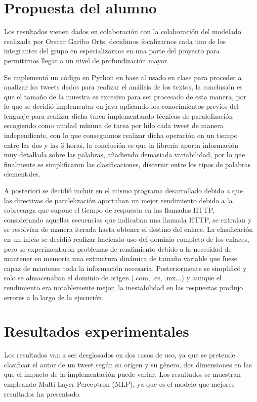 \documentclass[11pt,a4paper]{article}
\begin{document}
\section{Propuesta del alumno}

Los resultados vienen dados en colaboración con la colaboración del modelado realizada por Orscar Garibo Orts, decidimos focalizarnos cada uno de los integrantes del grupo en especializarnos en una parte del proyecto para permitirnos llegar a un nivel de profundización mayor.

Se implementó un código en Python en base al usado en clase para proceder a analizar los tweets dados para realizar el análisis de los textos, la conclusión es que el tamaño de la muestra es excesivo para ser procesado de esta manera, por lo que se decidió implementar en java aplicando los conocimientos previos del lenguaje para realizar dicha tarea implementando técnicas de paralelización escogiendo como unidad mínima de tarea por hilo cada tweet de manera independiente, con lo que conseguimos realizar dicha operación en un tiempo entre las dos y las 3 horas, la conclusión es que la librería aporta información muy detallada sobre las palabras, añadiendo demasiada variabilidad, por lo que finalmente se simplificaron las clasificaciones, discernir entre los tipos de palabras elementales. 

A posteriori se decidió incluir en el mismo programa desarrollado debido a que las directivas de paralelización aportaban un mejor rendimiento debido a la sobrecarga que supone el tiempo de respuesta en las llamadas HTTP, considerando aquellas secuencias que indicaban una llamada HTTP, se extraían y se resolvían de manera iterada hasta obtener el destino del enlace. La clasificación en un inicio se decidió realizar haciendo uso del dominio completo de los enlaces, pero se experimentaron problemas de rendimiento debido a la necesidad de mantener en memoria una extructura dinámica de tamaño variable que fuese capaz de mantener toda la información necesaria. Posteriormente se simplificó y solo se almacenaban el dominio de origen (.com, .es, .mx...) y aunque el rendimiento era notablemente mejor, la inestabilidad en las respuestas produjo errores a lo largo de la ejecución.

\section{Resultados experimentales}

Los resultados van a ser desglosados en dos casos de uso, ya que se pretende clasificar el autor de un tweet según su origen y su género, dos dimensiones en las que el impacto de la implementación puede variar. Los resultados se muestran empleando  Multi-Layer Perceptron (MLP), ya que es el modelo que mejores resultados ha presentado.
\end{document}
